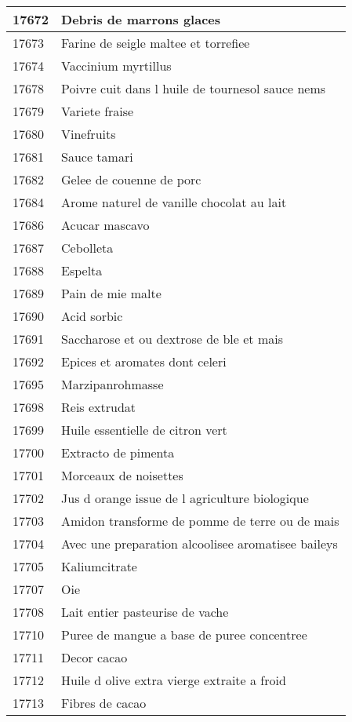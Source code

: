 \begin{longtable}{|l|l|}
17672 & Debris de marrons glaces \\ \hline 
17673 & Farine de seigle maltee et torrefiee \\ \hline 
17674 & Vaccinium myrtillus \\ \hline 
17678 & Poivre cuit dans l huile de tournesol sauce nems \\ \hline 
17679 & Variete fraise \\ \hline 
17680 & Vinefruits \\ \hline 
17681 & Sauce tamari \\ \hline 
17682 & Gelee de couenne de porc \\ \hline 
17684 & Arome naturel de vanille chocolat au lait \\ \hline 
17686 & Acucar mascavo \\ \hline 
17687 & Cebolleta \\ \hline 
17688 & Espelta \\ \hline 
17689 & Pain de mie malte \\ \hline 
17690 & Acid sorbic \\ \hline 
17691 & Saccharose et ou dextrose de ble et mais \\ \hline 
17692 & Epices et aromates dont celeri \\ \hline 
17695 & Marzipanrohmasse \\ \hline 
17698 & Reis extrudat \\ \hline 
17699 & Huile essentielle de citron vert \\ \hline 
17700 & Extracto de pimenta \\ \hline 
17701 & Morceaux de noisettes \\ \hline 
17702 & Jus d orange issue de l agriculture biologique \\ \hline 
17703 & Amidon transforme de pomme de terre ou de mais \\ \hline 
17704 & Avec une preparation alcoolisee aromatisee baileys \\ \hline 
17705 & Kaliumcitrate \\ \hline 
17707 & Oie \\ \hline 
17708 & Lait entier pasteurise de vache \\ \hline 
17710 & Puree de mangue a base de puree concentree \\ \hline 
17711 & Decor cacao \\ \hline 
17712 & Huile d olive extra vierge extraite a froid \\ \hline 
17713 & Fibres de cacao \\ \hline 

\end{longtable}
